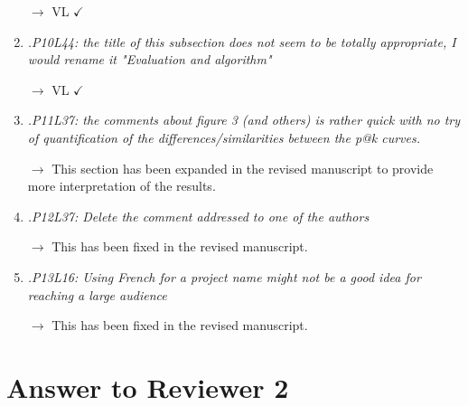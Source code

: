 \documentclass[10pt]{article}
\begin{document}
\begin{enumerate}
$\rightarrow$ VL $\checkmark$

\item \emph{.P10L44: the title of this subsection does not seem to be totally appropriate, I would rename it "Evaluation and algorithm"}

$\rightarrow$ VL $\checkmark$

\item \emph{.P11L37: the comments about figure 3 (and others) is rather quick with no try of quantification of the differences/similarities between the p@k curves.}

$\rightarrow$
This section has been expanded in the revised manuscript to provide more interpretation of the results.

\item \emph{.P12L37: Delete the comment addressed to one of the authors}

$\rightarrow$
This has been fixed in the revised manuscript.

\item \emph{.P13L16: Using French for a project name might not be a good idea for reaching a large audience}

$\rightarrow$
This has been fixed in the revised manuscript.

\end{enumerate}

\section{Answer to Reviewer 2}
\end{document}
